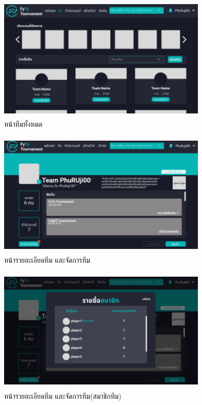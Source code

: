 \begin{figure}[h]
  \begin{center}
  \includegraphics[width=10cm,height=6cm,keepaspectratio]{allteam.png}
  \end{center}
  \caption[หน้าทีมทั้งหมด]{หน้าทีมทั้งหมด}
  \label{fig:หน้าทีมทั้งหมด}
\end{figure}

\begin{figure}[h]
  \begin{center}
  \includegraphics[width=10cm,height=6cm,keepaspectratio]{teamDetail.png}
  \end{center}
  \caption[หน้ารายละเอียดทีม และจัดการทีม]{หน้ารายละเอียดทีม และจัดการทีม}
  \label{fig:หน้ารายละเอียดทีม และจัดการทีม}
\end{figure}

\begin{figure}[h]
  \begin{center}
  \includegraphics[width=10cm,height=6cm,keepaspectratio]{member.png}
  \end{center}
  \caption[หน้ารายละเอียดทีม และจัดการทีม(สมาชิกทีม)]{หน้ารายละเอียดทีม และจัดการทีม(สมาชิกทีม)}
  \label{fig:หน้ารายละเอียดทีม และจัดการทีม(สมาชิกทีม)}
\end{figure}

